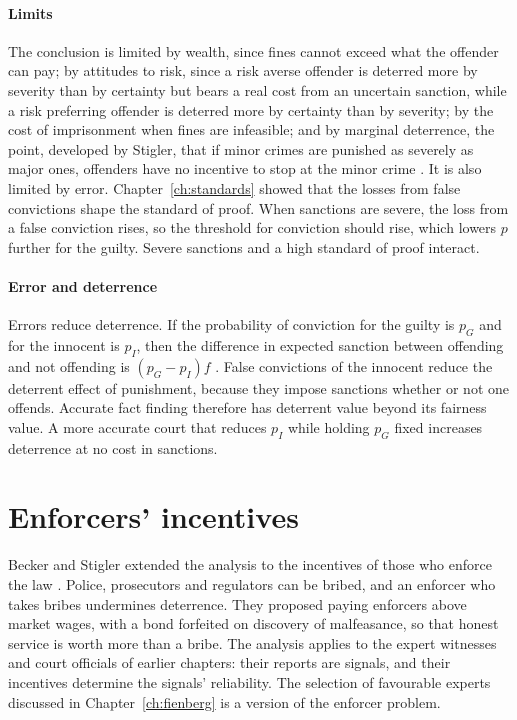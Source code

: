 \paragraph{Limits} The conclusion is limited by wealth, since fines cannot exceed what the offender can pay; by attitudes to risk, since a risk averse offender is deterred more by severity than by certainty but bears a real cost from an uncertain sanction, while a risk preferring offender is deterred more by certainty than by severity; by the cost of imprisonment when fines are infeasible; and by marginal deterrence, the point, developed by Stigler, that if minor crimes are punished as severely as major ones, offenders have no incentive to stop at the minor crime \citep{stigler1970}. It is also limited by error. Chapter~\ref{ch:standards} showed that the losses from false convictions shape the standard of proof. When sanctions are severe, the loss from a false conviction rises, so the threshold for conviction should rise, which lowers $p$ further for the guilty. Severe sanctions and a high standard of proof interact.

\paragraph{Error and deterrence} Errors reduce deterrence. If the probability of conviction for the guilty is $p_G$ and for the innocent is $p_I$, then the difference in expected sanction between offending and not offending is $(p_G - p_I)f$ \citep{kaplow1994}. False convictions of the innocent reduce the deterrent effect of punishment, because they impose sanctions whether or not one offends. Accurate fact finding therefore has deterrent value beyond its fairness value. A more accurate court that reduces $p_I$ while holding $p_G$ fixed increases deterrence at no cost in sanctions.

\section{Enforcers' incentives}

Becker and Stigler extended the analysis to the incentives of those who enforce the law \citep{becker1974}. Police, prosecutors and regulators can be bribed, and an enforcer who takes bribes undermines deterrence. They proposed paying enforcers above market wages, with a bond forfeited on discovery of malfeasance, so that honest service is worth more than a bribe. The analysis applies to the expert witnesses and court officials of earlier chapters: their reports are signals, and their incentives determine the signals' reliability. The selection of favourable experts discussed in Chapter~\ref{ch:fienberg} is a version of the enforcer problem.

